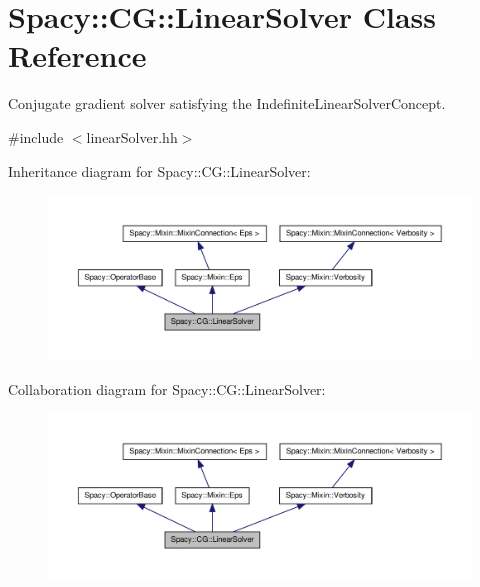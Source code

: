\hypertarget{classSpacy_1_1CG_1_1LinearSolver}{\section{\-Spacy\-:\-:\-C\-G\-:\-:\-Linear\-Solver \-Class \-Reference}
\label{classSpacy_1_1CG_1_1LinearSolver}
}


\-Conjugate gradient solver satisfying the \-Indefinite\-Linear\-Solver\-Concept.  




{\ttfamily \#include $<$linear\-Solver.\-hh$>$}



\-Inheritance diagram for \-Spacy\-:\-:\-C\-G\-:\-:\-Linear\-Solver\-:
\nopagebreak
\begin{figure}[H]
\begin{center}
\leavevmode
\includegraphics[width=350pt]{classSpacy_1_1CG_1_1LinearSolver__inherit__graph}
\end{center}
\end{figure}


\-Collaboration diagram for \-Spacy\-:\-:\-C\-G\-:\-:\-Linear\-Solver\-:
\nopagebreak
\begin{figure}[H]
\begin{center}
\leavevmode
\includegraphics[width=350pt]{classSpacy_1_1CG_1_1LinearSolver__coll__graph}
\end{center}
\end{figure}
